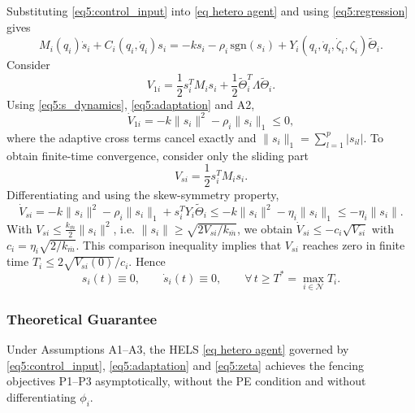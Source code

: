 Substituting \eqref{eq5:control_input} into \eqref{eq hetero agent} and using
\eqref{eq5:regression} gives
\begin{equation}\label{eq5:s_dynamics}
	M_i(q_i)\dot{s}_i + C_i(q_i,\dot{q}_i)s_i
	= -k s_i - \rho_i\,\mathrm{sgn}(s_i)
	+ Y_i(q_i,\dot{q}_i,\dot{\zeta}_i,\zeta_i)\tilde{\Theta}_i.
\end{equation}
Consider
\begin{equation}\label{eq5:V1}
	V_{1i} = \frac12 s_i^T M_i s_i + \frac12 \tilde{\Theta}_i^T \Lambda \tilde{\Theta}_i.
\end{equation}
Using \eqref{eq5:s_dynamics}, \eqref{eq5:adaptation} and A2,
\begin{equation}\label{eq5:V1_dot}
	\dot{V}_{1i} = -k\|s_i\|^2 - \rho_i\|s_i\|_1 \le 0,
\end{equation}
where the adaptive cross terms cancel exactly and
$\|s_i\|_1 = \sum_{l=1}^{p}|s_{il}|$. To obtain finite-time convergence, consider only the
sliding part
\begin{equation}\label{eq5:Vs}
	V_{si} = \frac12 s_i^T M_i s_i.
\end{equation}
Differentiating and using the skew-symmetry property,
\begin{equation}\label{eq5:Vs_dot}
	\dot{V}_{si} = -k\|s_i\|^2 - \rho_i\|s_i\|_1 + s_i^T Y_i \tilde{\Theta}_i
	\le -k\|s_i\|^2 - \eta_i\|s_i\|_1
	\le -\eta_i\|s_i\|.
\end{equation}
With $V_{si} \le \tfrac{k_{\overline m}}{2}\|s_i\|^2$, i.e.
$\|s_i\| \ge \sqrt{2V_{si}/k_{\overline m}}$, we obtain
$\dot{V}_{si} \le -c_i\sqrt{V_{si}}$ with $c_i = \eta_i\sqrt{2/k_{\overline m}}$.
This comparison inequality implies that $V_{si}$ reaches zero in finite time
$T_i \le 2\sqrt{V_{si}(0)}/c_i$. Hence
\begin{equation}\label{eq5:finite_time}
	s_i(t) \equiv 0,\qquad \dot{s}_i(t) \equiv 0,\qquad \forall\, t \ge T^* = \max_{i\in\mathcal{N}} T_i.
\end{equation}

\subsubsection{Theoretical Guarantee}

\begin{theorem}
	Under Assumptions A1--A3, the HELS \eqref{eq hetero agent} governed by
	\eqref{eq5:control_input}, \eqref{eq5:adaptation} and \eqref{eq5:zeta} achieves the
	fencing objectives P1--P3 asymptotically, without the PE condition and without
	differentiating $\phi_i$.
\end{theorem}

